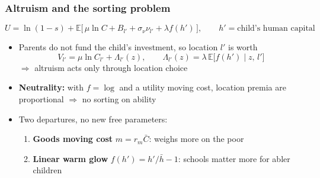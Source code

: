 \documentclass[11pt,hyperref={bookmarks=false},aspectratio=169]{beamer}
\begin{document}
\begin{frame}
\frametitle{Altruism and the sorting problem}
\[
U = \ln(1-s) + \mathbb{E}\big[\,\mu\ln C + B_{l'} + \sigma_\nu\nu_{l'} + \lambda f(h')\,\big],
\qquad h' = \text{child's human capital}
\]
\begin{itemize}
  \item Parents do not fund the child's investment, so location $l'$ is worth
  \[
  V_{l'} = \mu\ln C_{l'} + \Lambda_{l'}(z), \qquad
  \Lambda_{l'}(z) = \lambda\,\mathbb{E}\big[f(h')\mid z,\,l'\big]
  \]
  $\Rightarrow$ altruism acts \alert{only through location choice}
  \item \textbf{Neutrality:} with $f=\log$ and a utility moving cost, location premia are
        proportional $\Rightarrow$ no sorting on ability
  \item Two departures, no new free parameters:
  \begin{enumerate}
    \item \textbf{Goods moving cost} $m = r_m\bar C$: weighs more on the poor
    \item \textbf{Linear warm glow} $f(h') = h'/\bar h - 1$: schools matter more for abler children
  \end{enumerate}
\end{itemize}
\end{frame}
\end{document}
